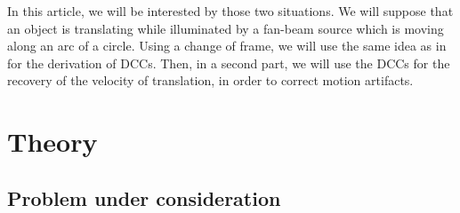 \documentclass[twocolumn]{IEEEtran}
\numberwithin{equation}{section}
\begin{document}
In this article, we will be interested by those two situations. We will suppose that an object is translating while illuminated by a fan-beam source which is moving along an arc of a circle. Using a change of frame, we will use the same idea as in~\cite{clackdoyle2015consistency} for the derivation of DCCs. Then, in a second part, we will use the DCCs for the recovery of the velocity of translation, in order to correct motion artifacts.

\section{Theory} 
\label{sec:theory}

\subsection{Problem under consideration}
\label{sub:problem_under_consideration}
\end{document}
